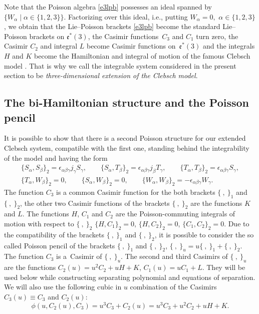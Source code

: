 \documentclass[10pt,a4paper]{amsart}
\def\a{\alpha}
\def\b{\beta}
\def\g{\gamma}
\def\e{\epsilon}
\numberwithin{equation}{section}
\begin{document}
\begin{Remark}
 Note that the Poisson algebra \eqref{e3lpb} possesses an ideal spanned by $\{W_{\a}\mid \a\in \{1,2,3\} \}$. Factorizing over this ideal, i.e., putting $W_{\a}=0,$ $\a\in \{1,2,3\}$, we obtain that the Lie--Poisson brackets \eqref{e3lpb} become the standard Lie--Poisson brackets on $\mathfrak{e}^*(3)$, the Casimir functions~$C_3$ and $C_1$ turn zero, the Casimir $C_2$ and integral $L$ become Casimir functions on~$\mathfrak{e}^*(3)$ and the integrals $H$ and $K$ become the Hamiltonian and integral of motion of the famous Clebsch model \cite{Clebsch}. That is why we call the integrable system considered in the present section to be {\it three-dimensional extension of the Clebsch model}.
\end{Remark}

\subsection{The bi-Hamiltonian structure and the Poisson pencil}
It is possible to show that there is a second Poisson structure
for our extended Clebsch system, compatible with the first one, standing behind the integrability of the model and having
the form
 \begin{subequations}\label{so4lpb}
\begin{gather}
\{ S_{\a}, S_{\b}\}_2=\e_{\a\b\g} j_{\g} S_{\g}, \qquad \{ S_{\a},
T_{\b}\}_2=\e_{\a\b\g} j_{\b} T_{\g},\qquad \{ T_{\a}, T_{\b}\}_2= \e_{\a\b\g} S_{\g},\label{e4lpb1}
\\
\{ T_{\a}, W_{\b}\}_2=0, \qquad \{ S_{\a},
W_{\b}\}_2=0,\qquad \{ W_{\a}, W_{\b}\}_2= - \e_{\a\b\g} W_{\g}.\label{so4lpb2}
\end{gather}
\end{subequations}
The function $C_3$ is a common Casimir function
for the both brackets $\{\ , \ \}_1$ and $\{\ , \ \}_2$, the other two Casimir functions of the brackets $\{\ , \ \}_2$ are the functions $K$ and $L$. The functions $H$, $C_1$ and $C_2$ are the Poisson-commuting integrals of motion with respect to $\{\ , \ \}_2$
$\{H,C_1\}_2=0$, $ \{H,C_2\}_2=0$, $ \{C_1,C_2\}_2=0$.
Due to the compatibility of the brackets $\{\ , \ \}_1$ and $\{\ , \ \}_2$, it is possible to consider the so called Poisson pencil of the brackets $\{\ , \ \}_1$ and $\{\ , \ \}_2$,
$
\{\ , \ \}_u= u\{\ , \ \}_1+ \{\ , \ \}_2$.
The function $C_3$ is a~Casimir
of $\{\ , \ \}_u$. The second and third Casimirs of $\{\ , \ \}_u$ are the functions
$
C_2(u)= u^{2}C_2+u H+K$,
$
C_1(u)= u C_1+L$.
They will be used below while constructing separating polynomial and equations of separation. We will also use the following cubic in $u$ combination of the Casimirs $C_3(u)\equiv C_3$ and $C_2(u)$:
\[
\phi(u,C_2(u),C_3)= u^3 C_3 +C_2(u)=u^3 C_3+ u^{2}C_2+u H+K.
\]
\end{document}
